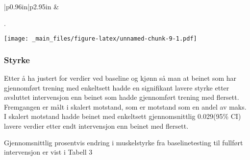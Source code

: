 \documentclass[
]{book}
\begin{document}
\begin{longtable}[c]{|p{0.96in}|p{2.95in}}
 &  \\

\noalign{\global\setlength{\arrayrulewidth}{2pt}}



\end{longtable}

.

\texttt{[image: \_main\_files/figure-latex/unnamed-chunk-9-1.pdf]}

\hypertarget{styrke}{%
\subsubsection{Styrke}\label{styrke}}

Etter å ha justert for verdier ved baseline og kjønn så man at beinet som har gjennomført trening med enkeltsett hadde en signifikant lavere styrke etter avsluttet intervensjon enn beinet som hadde gjennomført trening med flersett. Fremgangen er målt i skalert motstand, som er motstand som en andel av maks. I skalert motstand hadde beinet med enkeltsett gjennomsnittlig 0.029(95\% CI) lavere verdier etter endt intervensjon enn beinet med flersett.

Gjennomsnittlig prosentvis endring i muskelstyrke fra baselinetesting til fullført intervensjon er vist i Tabell 3

\providecommand{\docline}[3]{\noalign{\global\setlength{\arrayrulewidth}{#1}}\arrayrulecolor[HTML]{#2}\cline{#3}}

\setlength{\tabcolsep}{2pt}

\renewcommand*{\arraystretch}{1.5}
\end{document}
